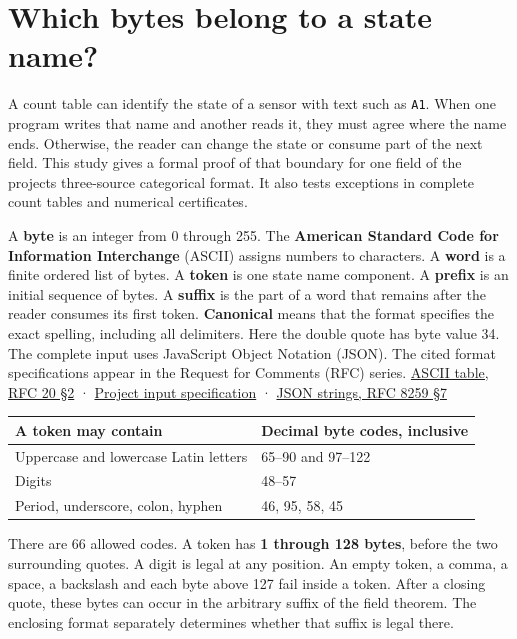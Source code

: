 \section{Which bytes belong to a state name?}\label{which-bytes-belong-to-a-state-name}

A count table can identify the state of a sensor with text such as \texttt{A1}. When one program writes that name and another reads it, they must agree where the name ends. Otherwise, the reader can change the state or consume part of the next field. This study gives a formal proof of that boundary for one field of the project\textquotesingle s three-source categorical format. It also tests exceptions in complete count tables and numerical certificates.

A \textbf{byte} is an integer from 0 through 255. The \textbf{American Standard Code for Information Interchange} (ASCII) assigns numbers to characters. A \textbf{word} is a finite ordered list of bytes. A \textbf{token} is one state name component. A \textbf{prefix} is an initial sequence of bytes. A \textbf{suffix} is the part of a word that remains after the reader consumes its first token. \textbf{Canonical} means that the format specifies the exact spelling, including all delimiters. Here the double quote has byte value 34. The complete input uses JavaScript Object Notation (JSON). The cited format specifications appear in the Request for Comments (RFC) series. \href{https://datatracker.ietf.org/doc/html/rfc20\#section-2}{ASCII table, RFC 20 §2} · \href{https://github.com/sepahead/pid-rs/blob/main/claims/SX-CERTIFIED-AVERAGED-PID3-001/bindings.md}{Project input specification} · \href{https://datatracker.ietf.org/doc/html/rfc8259\#section-7}{JSON strings, RFC 8259 §7}

{\def\LTcaptype{none} %
\begin{longtable}[]{@{}ll@{}}
\toprule\noalign{}
A token may contain & Decimal byte codes, inclusive \\
\midrule\noalign{}
\endhead
\bottomrule\noalign{}
\endlastfoot
Uppercase and lowercase Latin letters & 65--90 and 97--122 \\
Digits & 48--57 \\
Period, underscore, colon, hyphen & 46, 95, 58, 45 \\
\end{longtable}
}

There are 66 allowed codes. A token has \textbf{1 through 128 bytes}, before the two surrounding quotes. A digit is legal at any position. An empty token, a comma, a space, a backslash and each byte above 127 fail inside a token. After a closing quote, these bytes can occur in the arbitrary suffix of the field theorem. The enclosing format separately determines whether that suffix is legal there.

